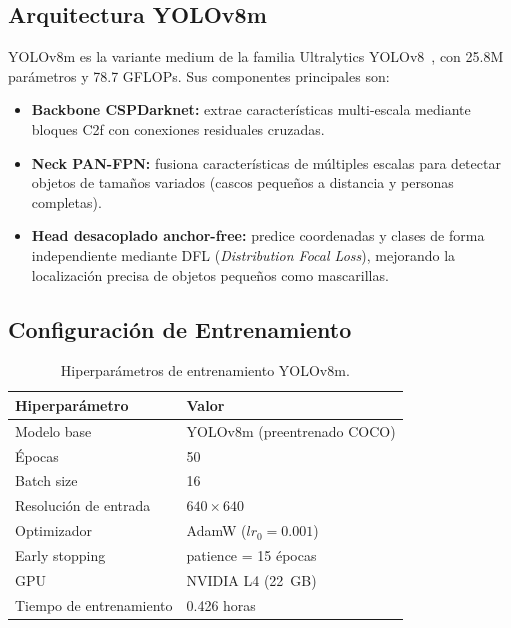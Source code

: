 \documentclass{article}
\begin{document}
\subsection{Arquitectura YOLOv8m}

YOLOv8m es la variante medium de la familia Ultralytics
YOLOv8~\cite{jocher2023yolov8}, con 25.8M parámetros y 78.7 GFLOPs.
Sus componentes principales son:

\begin{itemize}[itemsep=2pt]
  \item \textbf{Backbone CSPDarknet:} extrae características multi-escala
        mediante bloques C2f con conexiones residuales cruzadas.
  \item \textbf{Neck PAN-FPN:} fusiona características de múltiples escalas
        para detectar objetos de tamaños variados (cascos pequeños a
        distancia y personas completas).
  \item \textbf{Head desacoplado anchor-free:} predice coordenadas y clases
        de forma independiente mediante DFL (\emph{Distribution Focal Loss}),
        mejorando la localización precisa de objetos pequeños como mascarillas.
\end{itemize}

\subsection{Configuración de Entrenamiento}

\begin{table}[h]
  \centering
  \caption{Hiperparámetros de entrenamiento YOLOv8m.}
  \label{tab:training}
  \small
  \begin{tabular}{ll}
    \toprule
    \textbf{Hiperparámetro} & \textbf{Valor} \\
    \midrule
    Modelo base         & YOLOv8m (preentrenado COCO) \\
    Épocas              & 50 \\
    Batch size          & 16 \\
    Resolución de entrada & $640 \times 640$ \\
    Optimizador         & AdamW ($lr_0 = 0.001$) \\
    Early stopping      & patience = 15 épocas \\
    GPU                 & NVIDIA L4 (22~GB) \\
    Tiempo de entrenamiento & 0.426 horas \\
    \bottomrule
  \end{tabular}
\end{table}
\end{document}

